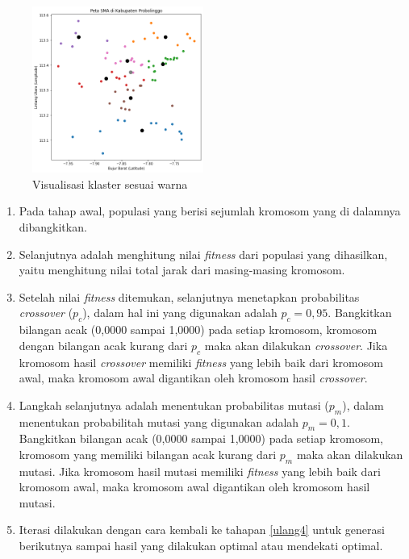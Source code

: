 \begin{figure}[H]
	\centering
	\includegraphics[width=0.5\textwidth]{Gambar/hasil klaster.png}
	\caption{Visualisasi klaster sesuai warna}
	\label{fig:hasilklas}
\end{figure}

\begin{enumerate}
	\item Pada tahap awal, populasi yang berisi sejumlah kromosom yang di dalamnya dibangkitkan.
	\item \label{ulang4} Selanjutnya adalah menghitung nilai \textit{fitness} dari populasi yang dihasilkan, yaitu menghitung nilai total jarak dari masing-masing kromosom.
	\item Setelah nilai \textit{fitness} ditemukan, selanjutnya menetapkan probabilitas \textit{crossover} ($p_c$), dalam hal ini yang digunakan adalah $p_c=0,95$. Bangkitkan bilangan acak (0,0000 sampai 1,0000) pada setiap kromosom, kromosom dengan bilangan acak kurang dari $p_c$ maka akan dilakukan \textit{crossover}. Jika kromosom hasil \textit{crossover} memiliki \textit{fitness} yang lebih baik  dari kromosom awal, maka kromosom awal digantikan oleh kromosom hasil \textit{crossover}.
	\item Langkah selanjutnya adalah menentukan probabilitas mutasi ($p_m$), dalam menentukan probabilitah mutasi yang digunakan adalah $p_m=0,1$. Bangkitkan bilangan acak (0,0000 sampai 1,0000) pada setiap kromosom, kromosom yang memiliki bilangan acak kurang dari $p_m$ maka akan dilakukan mutasi. Jika kromosom hasil mutasi memiliki \textit{fitness} yang lebih baik dari kromosom awal, maka kromosom awal digantikan oleh kromosom hasil mutasi.
	\item Iterasi dilakukan dengan cara kembali ke tahapan \ref{ulang4} untuk generasi berikutnya sampai hasil yang dilakukan optimal atau mendekati optimal.
\end{enumerate}

